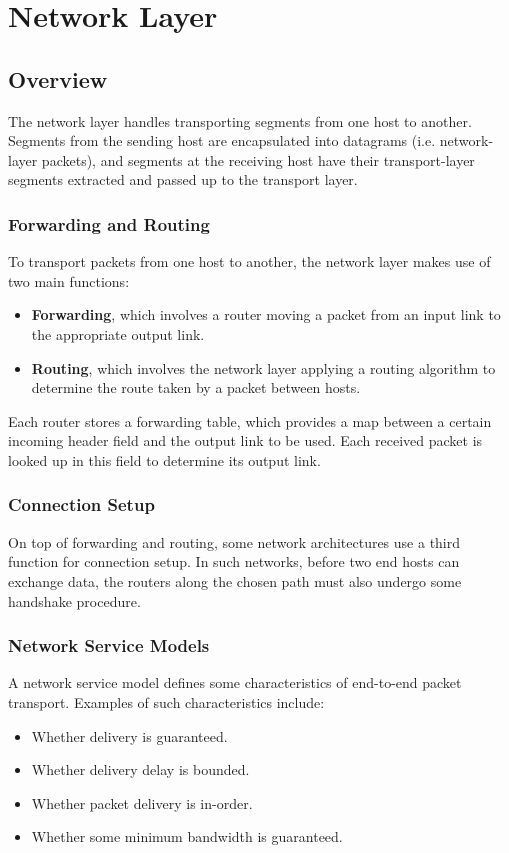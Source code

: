 \documentclass[12pt,titlepage]{article}
\begin{document}
  \newpage

  \section{Network Layer}

    \subsection{Overview}
      The network layer handles transporting segments from one host to another. Segments from the sending host are encapsulated into datagrams (i.e. network-layer packets),
      and segments at the receiving host have their transport-layer segments extracted and passed up to the transport layer.

      \subsubsection{Forwarding and Routing}
        To transport packets from one host to another, the network layer makes use of two main functions:
        \begin{itemize}
          \item \textbf{Forwarding}, which involves a router moving a packet from an input link to the appropriate output link.
          \item \textbf{Routing}, which involves the network layer applying a routing algorithm to determine the route taken by a packet between hosts.
        \end{itemize}

        Each router stores a forwarding table, which provides a map between a certain incoming header field and the output link to be used. Each received packet is  
        looked up in this field to determine its output link.

      \subsubsection{Connection Setup}
        On top of forwarding and routing, some network architectures use a third function for connection setup. In such networks, before two end hosts can exchange
        data, the routers along the chosen path must also undergo some handshake procedure.

      \subsubsection{Network Service Models}
        A network service model defines some characteristics of end-to-end packet transport. Examples of such characteristics include:
        \begin{itemize}
          \item Whether delivery is guaranteed.
          \item Whether delivery delay is bounded.
          \item Whether packet delivery is in-order.
          \item Whether some minimum bandwidth is guaranteed.
        \end{itemize}
\end{document}
